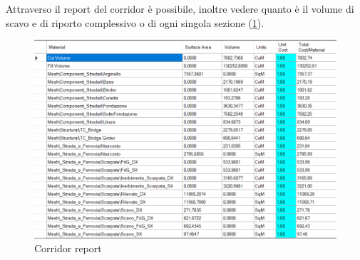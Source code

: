 Attraverso il report del corridor è possibile, inoltre vedere quanto è il volume di scavo e di riporto complessivo o di ogni singola sezione (\ref{Corridorreport}).

\begin{figure}[H]
    \includegraphics[width=\textwidth]{Figures/Corridor report.png}
      \caption{Corridor report}
      \label{Corridorreport}
\end{figure}


